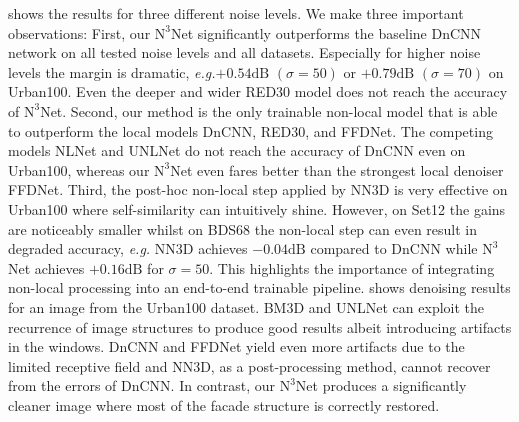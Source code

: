 \documentclass{article}
\makeatletter
\newcommand{\eg}{\emph{e.\thinspace{}g.}\@\xspace}
\newcommand\nnn{\text{N}^3}
\makeatother
\begin{document}
 shows the results for three different noise levels. 
We make three important observations:
First, our $\nnn$Net significantly outperforms the baseline DnCNN network on all tested noise levels and all datasets. 
Especially for higher noise levels the margin is dramatic, \eg $+0.54 \text{dB } (\sigma=50)$ or $+0.79 \text{dB } (\sigma=70)$ on Urban100.
Even the deeper and wider RED30 model does not reach the accuracy of $\nnn$Net. 
Second, our method is the only trainable non-local model that is able to outperform the local models DnCNN, RED30, and FFDNet.
The competing models NLNet and UNLNet do not reach the accuracy of DnCNN even on Urban100, whereas our $\nnn$Net even fares better than the strongest local denoiser FFDNet.
Third, the post-hoc non-local step applied by NN3D is very effective on Urban100 where self-similarity can intuitively shine. 
However, on Set12 the gains are noticeably smaller whilst on BDS68 the non-local step can even result in degraded accuracy, \eg NN3D
achieves $-0.04 \text{dB}$ compared to DnCNN while $\nnn$Net achieves  $+0.16 \text{dB}$ for $\sigma=50$.
This highlights the importance of integrating non-local processing into an end-to-end trainable pipeline.
 shows denoising results for an image from the Urban100 dataset. 
BM3D and UNLNet can exploit the recurrence of image structures to produce good results albeit introducing artifacts in the windows.
DnCNN and FFDNet yield even more artifacts due to the limited receptive field and NN3D, as a post-processing method, cannot recover from the errors of DnCNN.
In contrast, our $\nnn$Net produces a significantly cleaner image where most of the facade structure is correctly restored.
\end{document}

